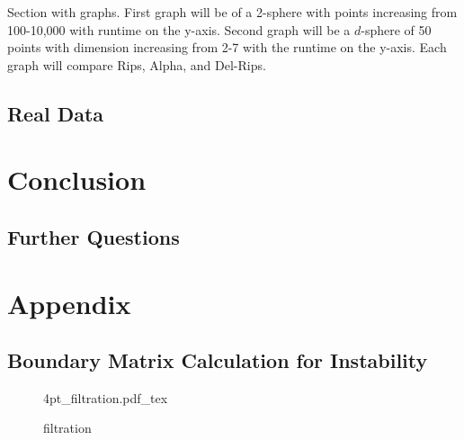 \documentclass[letterpaper,titlepage]{article}
\newcommand{\incfig}[1]{%
    \def\svgwidth{\columnwidth}
    {#1.pdf_tex}
}
\begin{document}
    Section with graphs. First graph will be of a 2-sphere with points increasing from 100-10,000 with runtime on the y-axis. Second graph will be a $d$-sphere of 50 points with dimension increasing from 2-7 with the runtime on the y-axis. Each graph will compare Rips, Alpha, and Del-Rips.


\subsection{Real Data}



\section{Conclusion}



\subsection{Further Questions}

\section{Appendix}

\subsection{Boundary Matrix Calculation for Instability}\label{boundary_mat}

\begin{figure}[ht]
    \centering
    \incfig{4pt_filtration}
    \caption{filtration}
    \label{fig:4pt_filtration}
\end{figure}
\end{document}
